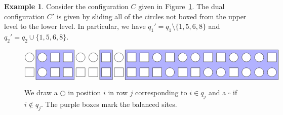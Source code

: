 \documentclass[reqno]{amsart}
\newcommand{\0}{\phantom{c}}
\newcommand{\mcI}{\mathcal{I}}
\newcommand{\abs}[1]{\left| #1 \right|}
\newcommand{\ive}[1]{\left[ #1 \right]}
\theoremstyle{plain}
\theoremstyle{definition}
\newtheorem{example}[thm]{Example}
\numberwithin{equation}{section}
\begin{document}

\begin{example}
Consider the configuration $C$ given in Figure~\ref{fig:balanced}.
The dual configuration $C'$ is given by sliding all of the circles not boxed from the upper level to the lower level.
In particular, we have $q_1' = q_1 \setminus \{1,5,6,8\}$ and $q_2' = q_2 \cup \{1,5,6,8\}$.
\end{example}

\begin{figure}[t]
\[
\begin{tikzpicture}[scale=0.75]
  \def\sc{0.85}   %
  \def\ll{2}   %
  \def\l{1}   %
  \draw[fill=blue!30] (1.5*\sc,\l-.5) rectangle(4.5*\sc,\ll+.5);
  \draw[fill=blue!30] (6.5*\sc,\l-.5) rectangle(7.5*\sc,\ll+.5);
  \draw[fill=blue!30] (8.5*\sc,\l-.5) rectangle(20.5*\sc,\ll+.5);
  \foreach \i in {1,2,5,6,8,11,13,14,17,18,19} { \draw[fill=white] (\i*\sc,\ll) circle (0.3); }
  \foreach \i in {3,4,7,9,10,12,15,16,20} { \draw[fill=white] (\i*\sc-.3,\ll-.3) rectangle +(0.6,+0.6); }
  \foreach \i in {2,12,15,16,18,19,20} { \draw[fill=white] (\i*\sc,\l) circle (0.3); }
  \foreach \i in {1,3,4,5,6,7,8,9,10,11,13,14,17} { \draw[fill=white] (\i*\sc-.3,\l-.3) rectangle +(0.6,+0.6); }
\end{tikzpicture}
\]
\caption{We draw a $\bigcirc$ in position $i$ in row $j$ corresponding to $i \in q_j$ and a $\square$ if $i \notin q_j$.
The purple boxes mark the balanced sites.}
\label{fig:balanced}
\end{figure}
\end{document}
